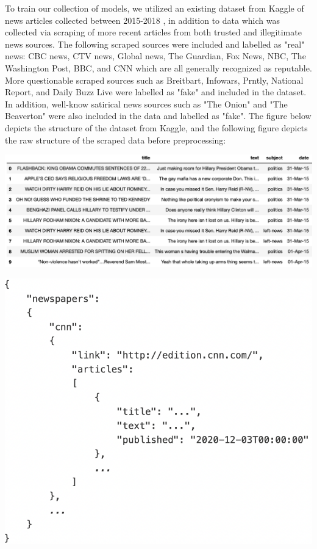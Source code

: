 \documentclass[10pt,twocolumn,letterpaper]{article}
\begin{document}
To train our collection of models, we utilized an existing dataset from Kaggle of news articles collected between 2015-2018 \cite{bisaillon_2020}, in addition to data which was collected via scraping of more recent articles from both trusted and illegitimate news sources. The following scraped sources were included and labelled as "real" news: CBC news, CTV news, Global news, The Guardian, Fox News, NBC, The Washington Post, BBC, and CNN which are all generally recognized as reputable. More questionable scraped sources such as Breitbart, Infowars, Prntly, National Report, and Daily Buzz Live were labelled as "fake" and included in the dataset. In addition, well-know satirical news sources such as "The Onion" and "The Beaverton" were also included in the data and labelled as "fake". The figure below depicts the structure of the dataset from Kaggle, and the following figure depicts the raw structure of the scraped data before preprocessing:
\begin{center}
\includegraphics[scale=0.3]{dt_example.png}
\end{center}
\begin{center}
\includegraphics[scale=0.3]{scraped_example.png}
\end{center}
\end{document}

